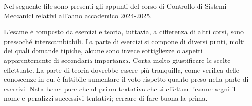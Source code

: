 \intro
Nel seguente file sono presenti gli appunti del corso di Controllo di Sistemi Meccanici relativi all'anno accademico 2024-2025.

L'esame è composto da esercizi e teoria, tuttavia, a differenza di altri corsi, sono pressoché interscambiabili.
La parte di esercizi si compone di diversi punti, molti dei quali domande tipiche, alcune sono invece sottigliezze o aspetti apparentemente di secondaria importanza. Conta molto giustificare le scelte effettuate.
La parte di teoria dovrebbe essere più tranquilla, come verifica delle conoscenze in cui è fattibile aumentare il voto rispetto quanto preso nella parte di esercizi.
Nota bene: pare che al primo tentativo che si effettua l'esame segni il nome e penalizzi successivi tentativi; cercare di fare buona la prima.
